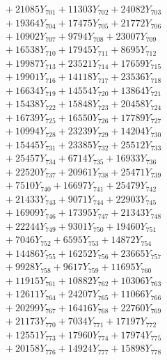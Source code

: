 \documentclass[a4paper,10pt]{article}
\begin{document}
{\begin{align}
&\;  + 21085 Y_{701} + 11303 Y_{702} + 24082 Y_{703} \\[0.3ex]
&\;  + 19364 Y_{704} + 17475 Y_{705} + 21772 Y_{706} \\[0.3ex]
&\;  + 10902 Y_{707} + 9794 Y_{708} + 23007 Y_{709} \\[0.3ex]
&\;  + 16538 Y_{710} + 17945 Y_{711} + 8695 Y_{712} \\[0.3ex]
&\;  + 19987 Y_{713} + 23521 Y_{714} + 17659 Y_{715} \\[0.3ex]
&\;  + 19901 Y_{716} + 14118 Y_{717} + 23536 Y_{718} \\[0.5ex]\allowbreak
&\;  + 16634 Y_{719} + 14554 Y_{720} + 13864 Y_{721} \\[0.3ex]
&\;  + 15438 Y_{722} + 15848 Y_{723} + 20458 Y_{724} \\[0.3ex]
&\;  + 16739 Y_{725} + 16550 Y_{726} + 17789 Y_{727} \\[0.3ex]
&\;  + 10994 Y_{728} + 23239 Y_{729} + 14204 Y_{730} \\[0.3ex]
&\;  + 15445 Y_{731} + 23385 Y_{732} + 25512 Y_{733} \\[0.3ex]
&\;  + 25457 Y_{734} + 6714 Y_{735} + 16933 Y_{736} \\[0.3ex]
&\;  + 22520 Y_{737} + 20961 Y_{738} + 25471 Y_{739} \\[0.3ex]
&\;  + 7510 Y_{740} + 16697 Y_{741} + 25479 Y_{742} \\[0.3ex]
&\;  + 21433 Y_{743} + 9071 Y_{744} + 22903 Y_{745} \\[0.3ex]
&\;  + 16909 Y_{746} + 17395 Y_{747} + 21343 Y_{748} \\[0.5ex]\allowbreak
&\;  + 22244 Y_{749} + 9301 Y_{750} + 19460 Y_{751} \\[0.3ex]
&\;  + 7046 Y_{752} + 6595 Y_{753} + 14872 Y_{754} \\[0.3ex]
&\;  + 14486 Y_{755} + 16252 Y_{756} + 23665 Y_{757} \\[0.3ex]
&\;  + 9928 Y_{758} + 9617 Y_{759} + 11695 Y_{760} \\[0.3ex]
&\;  + 11915 Y_{761} + 10882 Y_{762} + 10306 Y_{763} \\[0.3ex]
&\;  + 12611 Y_{764} + 24207 Y_{765} + 11066 Y_{766} \\[0.3ex]
&\;  + 20299 Y_{767} + 16416 Y_{768} + 22760 Y_{769} \\[0.3ex]
&\;  + 21173 Y_{770} + 7034 Y_{771} + 17197 Y_{772} \\[0.3ex]
&\;  + 12551 Y_{773} + 17960 Y_{774} + 17974 Y_{775} \\[0.3ex]
&\;  + 20158 Y_{776} + 14924 Y_{777} + 15898 Y_{778} \\[0.5ex]\allowbreak

\end{align}}
\end{document}
